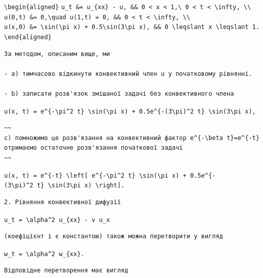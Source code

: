 \documentclass[
  ukrainian,
]{article}
\begin{document}
\texttt{\textbackslash{}begin\{aligned\}}
\texttt{u\_t\ \&=\ u\_\{xx\}\ -\ u,\ \&\&\ 0\ \textless{}\ x\ \textless{}\ 1,\textbackslash{}\ 0\ \textless{}\ t\ \textless{}\ \textbackslash{}infty,\ \textbackslash{}\textbackslash{}}
\texttt{u(0,t)\ \&=\ 0,\textbackslash{}quad\ u(1,t)\ =\ 0,\ \&\&\ 0\ \textless{}\ t\ \textless{}\ \textbackslash{}infty,\ \textbackslash{}\textbackslash{}}
\texttt{u(x,0)\ \&=\ \textbackslash{}sin(\textbackslash{}pi\ x)\ +\ 0.5\textbackslash{}sin(3\textbackslash{}pi\ x),\ \&\&\ 0\ \textbackslash{}leqslant\ x\ \textbackslash{}leqslant\ 1.}
\texttt{\textbackslash{}end\{aligned\}}

\begin{verbatim}
За методом, описаним вище, ми

- a) тимчасово відкинути конвективний член u у початковому рівнянні.

- b) записати розв'язок змішаної задачі без конвективного члена
\end{verbatim}

\texttt{u(x,\ t)\ =\ e\^{}\{-\textbackslash{}pi\^{}2\ t\}\ \textbackslash{}sin(\textbackslash{}pi\ x)\ +\ 0.5e\^{}\{-(3\textbackslash{}pi)\^{}2\ t\}\ \textbackslash{}sin(3\textbackslash{}pi\ x),}

\begin{verbatim}
~~
c) помножимо це розв'язання на конвективний фактор e^{-\beta t}=e^{-t} отримаємо остаточне розв'язання початкової задачі
~~
\end{verbatim}

\texttt{u(x,\ t)\ =\ e\^{}\{-t\}\ \textbackslash{}left{[}\ e\^{}\{-\textbackslash{}pi\^{}2\ t\}\ \textbackslash{}sin(\textbackslash{}pi\ x)\ +\ 0.5e\^{}\{-(3\textbackslash{}pi)\^{}2\ t\}\ \textbackslash{}sin(3\textbackslash{}pi\ x)\ \textbackslash{}right{]}.}

\begin{verbatim}
2. Рівняння конвективної дифузії
\end{verbatim}

\texttt{u\_t\ =\ \textbackslash{}alpha\^{}2\ u\_\{xx\}\ -\ v\ u\_x}

\begin{verbatim}
(коефіцієнт і є константою) також можна перетворити у вигляд
\end{verbatim}

\texttt{w\_t\ =\ \textbackslash{}alpha\^{}2\ w\_\{xx\}.}

\begin{verbatim}
Відповідне перетворення має вигляд
\end{verbatim}
\end{document}
